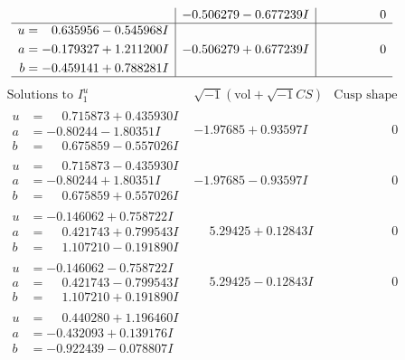 \documentclass[1p]{elsarticle_modified}
\theoremstyle{definition}
\newcommand{\I}{\sqrt{-1}}
\begin{document}
$$\begin{array}{c|c|c}
 & -0.506279 - 0.677239 I & \phantom{-0.000000 } 0 \\ \hline\begin{aligned}
u &= \phantom{-}0.635956 - 0.545968 I \\
a &= -0.179327 + 1.211200 I \\
b &= -0.459141 + 0.788281 I\end{aligned}
 & -0.506279 + 0.677239 I & \phantom{-0.000000 } 0\\
 \hline 
 \end{array}$$\newpage$$\begin{array}{c|c|c}  
\text{Solutions to }I^u_{1}& \I (\text{vol} + \sqrt{-1}CS) & \text{Cusp shape}\\
 \hline 
\begin{aligned}
u &= \phantom{-}0.715873 + 0.435930 I \\
a &= -0.80244 - 1.80351 I \\
b &= \phantom{-}0.675859 - 0.557026 I\end{aligned}
 & -1.97685 + 0.93597 I & \phantom{-0.000000 } 0 \\ \hline\begin{aligned}
u &= \phantom{-}0.715873 - 0.435930 I \\
a &= -0.80244 + 1.80351 I \\
b &= \phantom{-}0.675859 + 0.557026 I\end{aligned}
 & -1.97685 - 0.93597 I & \phantom{-0.000000 } 0 \\ \hline\begin{aligned}
u &= -0.146062 + 0.758722 I \\
a &= \phantom{-}0.421743 + 0.799543 I \\
b &= \phantom{-}1.107210 - 0.191890 I\end{aligned}
 & \phantom{-}5.29425 + 0.12843 I & \phantom{-0.000000 } 0 \\ \hline\begin{aligned}
u &= -0.146062 - 0.758722 I \\
a &= \phantom{-}0.421743 - 0.799543 I \\
b &= \phantom{-}1.107210 + 0.191890 I\end{aligned}
 & \phantom{-}5.29425 - 0.12843 I & \phantom{-0.000000 } 0 \\ \hline\begin{aligned}
u &= \phantom{-}0.440280 + 1.196460 I \\
a &= -0.432093 + 0.139176 I \\
b &= -0.922439 - 0.078807 I\end{aligned}

\end{array}$$
\end{document}
